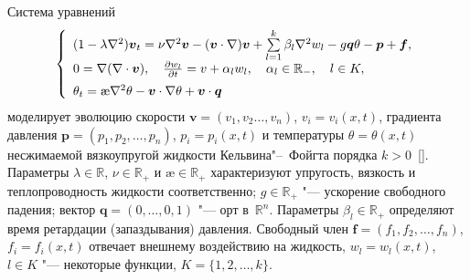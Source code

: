 
\date{29/VI/2010} %



\maketitle


Система уравнений
\begin{equation}
\left \{
\begin{array}{l}
  
(1- \lambda {\nabla}^2)\boldsymbol{v}_t=
\nu {\nabla}^2\boldsymbol{v}-(\boldsymbol{v} \cdot \nabla)\boldsymbol{v}+ \sum\limits_{l=1}^{k} \beta_l {\nabla}^2 { w}_l - g \boldsymbol{q} \theta -\boldsymbol{p} +\boldsymbol{f},
\\
  0=\nabla (\nabla \cdot \boldsymbol{v}),\quad  \frac{\partial  { w}_l}{\partial t} = {v}+ {\alpha}_l { w}_l,\quad 
{\alpha}_l \in {\mathbb R}_-,\quad 
l\in K, \vspace{2mm}
\\ 
   \theta_t=
\text{\ae} {\nabla}^2 \theta -\boldsymbol{v} \cdot \nabla \theta +\boldsymbol{v} \cdot
\boldsymbol{q}
\end{array} \right. 
\label{suk:eq:1}
\end{equation}
моделирует эволюцию скорости $\boldsymbol{v}=(v_1, v_2 \ldots, v_n)$, 
$v_i=v_i(x, t)$, градиента давления $\boldsymbol{p}=(p_1, p_2, \ldots, p_n)$, $p_i=p_i(x, t)$ и температуры
  $\theta =\theta (x, t)$ несжимаемой вязкоупругой жидкости Кельвина"--~Фойгта  порядка $k>0$~[].  
 Параметры $\lambda \in \mathbb R$, $\nu \in {\mathbb R}_{+}$ и $\text{\ae} \in {\mathbb R}_{+}$
характеризуют упругость, вязкость и теплопроводность жидкости соответственно; $g \in {\mathbb R}_{+} $ "---  ускорение свободного
падения; вектор $\boldsymbol{q} =(0, \ldots, 0, 1) $ "---  орт в~${\mathbb R}^n$. 
Параметры ${\beta}_l \in {\mathbb R}_{+}$ определяют время ретардации (запаздывания) давления.
 Свободный член $\boldsymbol{f}=(f_1, f_2, \ldots, f_n)$, $f_i= f_i(x, t)$ отвечает внешнему воздействию на жидкость,  ${w}_{l}={w}_{l}(x, t)$, $l\in K$ "--- некоторые функции, $K=\{1, 2, \dots, k\}$.


